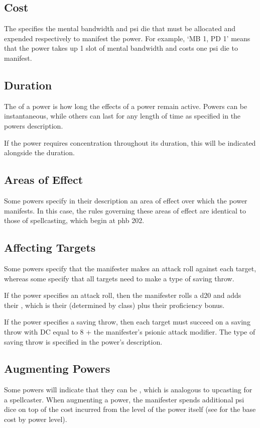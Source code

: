 \subsection{Cost}
The  specifies the mental bandwidth and psi die
that must be allocated and expended respectively to manifest the power.
For example,
`MB 1, PD 1'
means that the power takes up 1 slot of mental bandwidth
and costs one psi die to manifest.

\subsection{Duration}
The  of a power is how long the effects
of a power remain active.
Powers can be instantaneous,
while others can last for any length of time
as specified in the powers description.

If the power requires concentration throughout its duration,
this will be indicated alongside the duration.

\subsection{Areas of Effect}
Some powers specify in their description an area of effect
over which the power manifests.
In this case, the rules governing these areas of effect
are identical to those of spellcasting, which begin at
phb 202.

\subsection{Affecting Targets}
Some powers specify that the manifester makes an attack
roll against each target,
whereas some specify that all targets need to make
a type of saving throw.

If the power specifies an attack roll,
then the manifester rolls a d20
and adds their ,
which is their  (determined by class)
plus their proficiency bonus.

If the power specifies a saving throw,
then each target must succeed on a saving throw
with DC equal to 8 + the manifester's psionic attack modifier.
The type of saving throw
is specified in the power's description.

\subsection{Augmenting Powers}
\label{sub:augmenting}
Some powers will indicate that they can be ,
which is analogous to upcasting for a spellcaster.
When augmenting a power,
the manifester spends additional psi dice on top of the cost
incurred from the level of the power itself
(see  for the base cost by power level).

